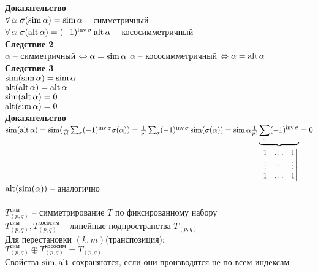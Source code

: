 \documentclass[12pt]{article}
\begin{document}
\textbf{Доказательство}\\
$\fall \alpha\ \sigma(\Sim \alpha) = \Sim \alpha$ -- симметричный\\
$\fall \alpha\ \sigma(\alt \alpha) = (-1)^{\inv \sigma} \alt \alpha$ -- кососимметричный\\
\textbf{Следствие 2}\\
$\alpha$ -- симметричный $\LRto \alpha = \Sim \alpha$
$\alpha$ -- кососимметричный $\LRto \alpha = \alt \alpha$\\
\textbf{Следствие 3}\\
$\Sim (\Sim \alpha) = \Sim \alpha$\\
$\alt (\alt \alpha) = \alt \alpha$\\
$\Sim (\alt \alpha) = 0$\\
$\alt (\Sim \alpha) = 0$\\
\textbf{Доказательство}\\
$\Sim (\alt \alpha) = \Sim (\frac1{p!}\sum_{\sigma} (-1)^{\inv \sigma} \sigma(\alpha)) = \frac1{p!} \sum_\sigma (-1)^{\inv \sigma} \Sim (\sigma(\alpha)) = \Sim \alpha \frac1{p!} \ub{\begin{vmatrix}
    1 & \ldots & 1\\
    \vdots & \ddots & \vdots\\
    1 & \ldots & 1
\end{vmatrix}}{\sum_\sigma (-1)^{\inv \sigma}} = 0$\\
$\alt (\Sim (\alpha))$ -- аналогично\\\\
$T^{\text{сим}}_{(p,q)}$ -- симметрирование $T$ по фиксированному набору\\
$T^{\text{сим}}_{(p,q)}, T^{\text{кососим}}_{(p,q)}$ -- линейные подпространства $T_{(p,q)}$\\
Для перестановки $(k,m)$(транспозиция):\\
$T^{\text{сим}}_{(p,q)} \oplus T^{\text{кососим}}_{(p,q)} = T_{(p,q)}$\\
\ul{Свойства $\Sim, \alt$ сохраняются, если они производятся не по всем индексам}
\end{document}
